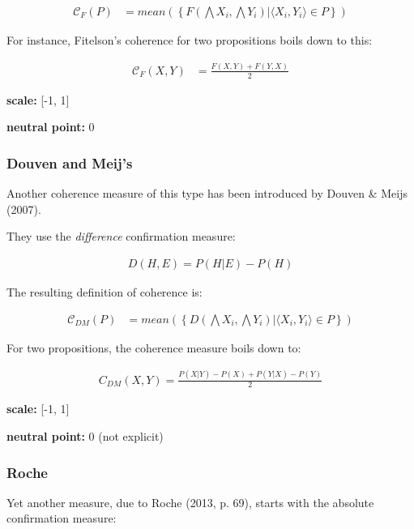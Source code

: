 \documentclass[10pt,]{scrartcl}
\begin{document}
\begin{align}
\tag{Fitelson}  
    \mathcal{C}_{F}(P) & =
mean\left(\left\{F(\bigwedge X_i, \bigwedge Y_i) | \langle X_i, Y_i\rangle \in P\right\} \right)
\end{align}

\noindent For instance, Fitelson's coherence for two propositions boils
down to this:

\begin{align}    
    \tag{Fitelson pairs}  
    \mathcal{C}_{F}(X,Y) &= \frac{F(X,Y)+F(Y,X)}{2}
    \label{coh:Fitelson}
\end{align}

\noindent \textbf{scale:} {[}-1, 1{]}

\noindent \textbf{neutral point:} 0

\subsubsection{Douven and Meij's}

Another coherence measure of this type has been introduced by Douven \&
Meijs (2007).

They use the \textit{difference} confirmation measure:

\begin{align*}
    D(H,E) = P(H|E) - P(H)
\end{align*}

The resulting definition of coherence is:

\begin{align}
\tag{DM}  
    \mathcal{C}_{DM}(P) & =
mean\left(\left\{D(\bigwedge X_i, \bigwedge Y_i) | \langle X_i, Y_i\rangle \in P\right\} \right)
\end{align}

For two propositions, the coherence measure boils down to:

\begin{align}
    \tag{DM pairs}
    \label{coh:DM}
    C_{DM}(X,Y)= \frac{P(X|Y) - P(X) + P(Y|X) - P(Y)}{2}
\end{align}

\noindent \textbf{scale:} {[}-1, 1{]}

\noindent \textbf{neutral point:} 0 (not explicit)

\subsubsection{Roche}

Yet another measure, due to Roche (2013, p. 69), starts with the
absolute confirmation measure:
\end{document}
